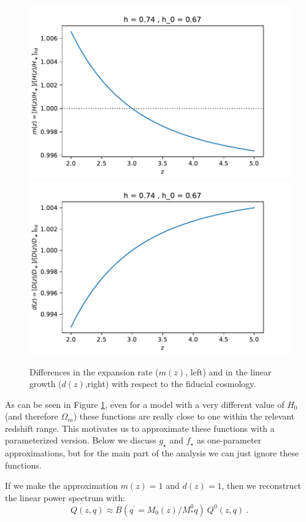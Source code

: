 \begin{figure}[ht]
 \begin{center}
  \includegraphics[scale=0.5]{Figures/mz_h074}
  \includegraphics[scale=0.5]{Figures/dz_h074}
 \end{center}
 \caption{Differences in the expansion rate ($m(z)$, left) and in the
  linear growth ($d(z)$,right) with respect to the fiducial cosmology.}
 \label{fig:mz_dz}
\end{figure}

As can be seen in Figure \ref{fig:mz_dz}, even for a model with a very
different value of $H_0$ (and therefore $\Omega_m$) these functions are 
really close to one within the relevant redshift range.
This motivates us to approximate these functions with a parameterized version.
Below we discuss $g_\star$ and $f_\star$ as one-parameter approximations,
but for the main part of the analysis we can just ignore these functions.

If we make the approximation $m(z)=1$ and $d(z)=1$, then we reconstruct
the linear power spectrum with:
\begin{equation}
 Q(z,q) \approx B(q^\prime= M_0(z)/M^0_\ast q) ~ Q^0(z,q) ~.
\end{equation}



